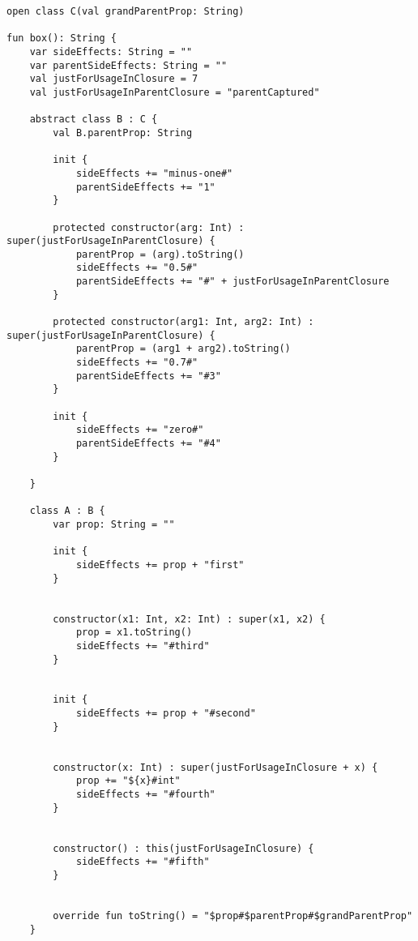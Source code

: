 \begin{lstlisting}[caption = Исходный код компиляторного теста localClasses.kt-384517712inheritance.kt]
open class C(val grandParentProp: String)

fun box(): String {
    var sideEffects: String = ""
    var parentSideEffects: String = ""
    val justForUsageInClosure = 7
    val justForUsageInParentClosure = "parentCaptured"

    abstract class B : C {
        val B.parentProp: String

        init {
            sideEffects += "minus-one#"
            parentSideEffects += "1"
        }

        protected constructor(arg: Int) : super(justForUsageInParentClosure) {
            parentProp = (arg).toString()
            sideEffects += "0.5#"
            parentSideEffects += "#" + justForUsageInParentClosure
        }

        protected constructor(arg1: Int, arg2: Int) : super(justForUsageInParentClosure) {
            parentProp = (arg1 + arg2).toString()
            sideEffects += "0.7#"
            parentSideEffects += "#3"
        }

        init {
            sideEffects += "zero#"
            parentSideEffects += "#4"
        }

    }

    class A : B {
        var prop: String = ""

        init {
            sideEffects += prop + "first"
        }


        constructor(x1: Int, x2: Int) : super(x1, x2) {
            prop = x1.toString()
            sideEffects += "#third"
        }


        init {
            sideEffects += prop + "#second"
        }


        constructor(x: Int) : super(justForUsageInClosure + x) {
            prop += "${x}#int"
            sideEffects += "#fourth"
        }


        constructor() : this(justForUsageInClosure) {
            sideEffects += "#fifth"
        }


        override fun toString() = "$prop#$parentProp#$grandParentProp"
    }


\end{lstlisting}
